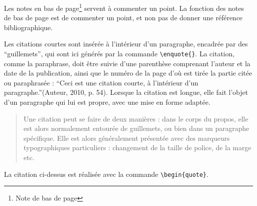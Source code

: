 Les notes en bas de page\footnote{Note de bas de page} servent à commenter un point. La fonction des notes de bas de page est de commenter un point, et non pas de donner une référence bibliographique.

Les citations courtes sont insérée à l'intérieur d'un paragraphe, encadrée par des \enquote{guillemets}, qui sont ici générés par la commande \verb?\enquote{}?. La citation, comme la paraphrase, doit être suivie d'une parenthèse comprenant l'auteur et la date de la publication, ainsi que le numéro de la page d'où est tirée la partie citée ou paraphrasée : \enquote{Ceci est une citation courte, à l'intérieur d'un paragraphe.}(Auteur, 2010, p. 54). Lorsque la citation est longue, elle fait l'objet d'un paragraphe qui lui est propre, avec une mise en forme adaptée.

\begin{quote}
	Une citation peut se faire de deux manières : dans le corps du propos, elle est alors normalement entourée de guillemets, ou bien dans un paragraphe spécifique. Elle est alors	généralement présentée avec des marqueurs typographiques particuliers : changement de la taille de police, de la marge etc.
\end{quote}

La citation ci-dessus est réalisée avec la commande \verb?\begin{quote}?.

